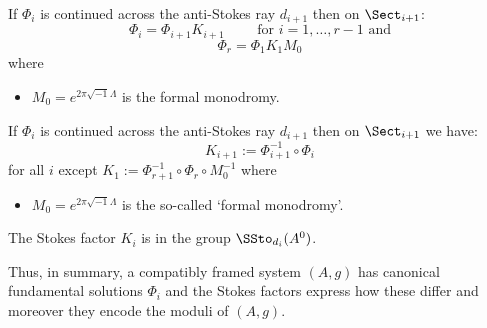 \begin{paracol}{2} %
  \begin{lem}
    If $\Phi_i$ is continued across the anti-Stokes ray $d_{i+1}$ then on
    $\Sect_{i+1}$:
    \[
      \Phi_i=\Phi_{i+1}K_{i+1}
      \qquad \text{ for } i=1,\dots,r-1 \text{ and}
    \]
    \[
      \Phi_r=\Phi_1K_1M_0
    \]
    where
    \begin{itemize}
      \item $M_0=e^{2\pi\sqrt{-1}\Lambda}$ is the formal monodromy.
    \end{itemize}
  \end{lem}
  \switchcolumn %
  \begin{defn}
    If $\Phi_i$ is continued across the anti-Stokes ray $d_{i+1}$ then on
    $\Sect_{i+1}$ we have:
    \[
      K_{i+1}:=\Phi_{i+1}^{-1}\circ\Phi_i
    \]
    for all $i$ except $K_1:=\Phi_{r+1}^{-1}\circ\Phi_r\circ M_0^{-1}$
    where
    \begin{itemize}
      \item $M_0=e^{2\pi\sqrt{-1}\Lambda}$ is the so-called `formal monodromy'.
    \end{itemize}
  \end{defn}
  \begin{lem}
    The Stokes factor $K_i$ is in the group $\SSto_{d_i}(A^0)$.
  \end{lem}
\end{paracol} %
Thus, in summary, a compatibly framed system $(A,g)$ has canonical
fundamental solutions $\Phi_i$ and the Stokes factors express how these
differ and moreover they encode the moduli of $(A,g)$.

